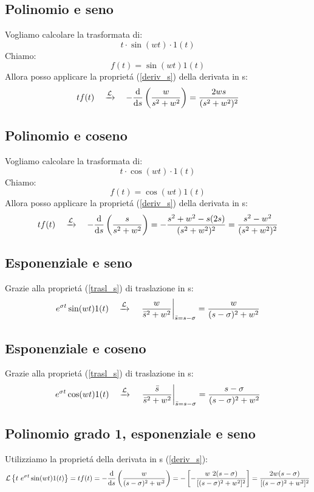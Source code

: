 \documentclass[../main.tex]{subfiles}
\begin{document}
	\subsection{Polinomio e seno}
	\label{trasf_t_seno}
	Vogliamo calcolare la trasformata di: $$ t \cdot \sin(wt) \cdot 1(t) $$
	Chiamo: $$ f(t) = \sin(wt)1(t) $$
	Allora posso applicare la propriet\'{a} (\ref{deriv_s}) della derivata in s: $$ t f(t) \quad \xrightarrow{\mathcal{L}} \quad -\frac{\mathrm{d} }{\mathrm{d} s}\left( \frac{w}{s^2+w^2}\right) = \frac{2ws}{(s^2+w^2)^2} $$
	\subsection{Polinomio e coseno}
	\label{trasf_t_coseno}
	Vogliamo calcolare la trasformata di: $$ t \cdot \cos(wt) \cdot 1(t) $$
	Chiamo: $$ f(t) = \cos(wt)1(t) $$
	Allora posso applicare la propriet\'{a} (\ref{deriv_s}) della derivata in s: $$ t f(t) \quad \xrightarrow{\mathcal{L}} \quad -\frac{\mathrm{d} }{\mathrm{d} s}\left( \frac{s}{s^2+w^2}\right) = -\frac{s^2+w^2-s(2s)}{(s^2+w^2)^2} = \frac{s^2-w^2}{(s^2+w^2)^2} $$
	\subsection{Esponenziale e seno}
	Grazie alla propriet\'{a} (\ref{trasl_s}) di traslazione in s:
	$$ e^{\sigma t} \sin(wt) 1(t) \quad \xrightarrow{\mathcal{L}} \quad  \left. \frac{w}{\bar{s}^2+w^2} \right|_{\bar{s}=s-\sigma} = \frac{w}{(s-\sigma)^2 + w^2} $$
	\subsection{Esponenziale e coseno}
	Grazie alla propriet\'{a} (\ref{trasl_s}) di traslazione in s:
	$$ e^{\sigma t} \cos(wt) 1(t) \quad \xrightarrow{\mathcal{L}} \quad  \left. \frac{\bar{s}}{\bar{s}^2+w^2} \right|_{\bar{s}=s-\sigma} = \frac{s-\sigma}{(s-\sigma)^2 + w^2} $$
	\subsection{Polinomio grado 1, esponenziale e seno}
	Utilizziamo la propriet\'{a} della derivata in s (\ref{deriv_s}):
	$$ \mathcal{L} \left\lbrace t\ e^{\sigma t} \sin(wt) 1(t) \right\rbrace = t f(t) = -\frac{\mathrm{d} }{\mathrm{d} s} \left( \frac{w}{(s-\sigma)^2+w^2} \right) = - \left[ -\frac{w\ 2(s-\sigma)}{[(s-\sigma)^2+w^2]^2} \right] = \frac{2w(s-\sigma)}{[(s-\sigma)^2+w^2]^2} $$
\end{document}
